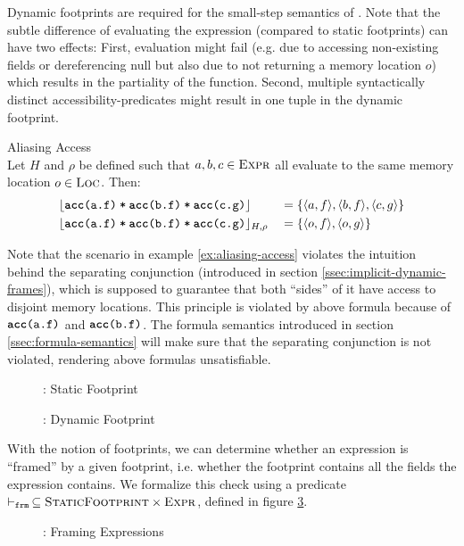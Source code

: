 \begin{description}
    Dynamic footprints are required for the small-step semantics of \svlidf.
    Note that the subtle difference of evaluating the expression (compared to static footprints) can have two effects:
    First, evaluation might fail (e.g. due to accessing non-existing fields or dereferencing null but also due to not returning a memory location $o$) which results in the partiality of the function.
    Second, multiple syntactically distinct accessibility-predicates might result in one tuple in the dynamic footprint.
    \begin{example}{Aliasing Access}\\
        \label{ex:aliasing-access}
        Let $H$ and $\rho$ be defined such that $a, b, c \in \setExpr$ all evaluate to the same memory location $o \in \setLoc$.
        Then:
        \begin{alignat*}{2}
        & \staticFP{\phiCons{\phiAcc{a}{f}}{\phiCons{\phiAcc{b}{f}}{\phiAcc{c}{g}}}} &&= \{ \langle a, f \rangle, \langle b, f \rangle, \langle c, g \rangle \}\\
        & \dynamicFP{H}{\rho}{\phiCons{\phiAcc{a}{f}}{\phiCons{\phiAcc{b}{f}}{\phiAcc{c}{g}}}} &&= \{ \langle o, f \rangle, \langle o, g \rangle \}
        \end{alignat*}
    \end{example}
    
    Note that the scenario in example \ref{ex:aliasing-access} violates the intuition behind the separating conjunction (introduced in section \ref{ssec:implicit-dynamic-frames}), which is supposed to guarantee that both “sides” of it have access to disjoint memory locations.
    This principle is violated by above formula because of $\phiAcc{a}{f}$ and $\phiAcc{b}{f}$.
    The formula semantics introduced in section \ref{ssec:formula-semantics} will make sure that the separating conjunction is not violated, rendering above formulas unsatisfiable.
\end{description}
\begin{figure}[h]
    
    \caption{\svlidf: Static Footprint}
    \label{fig:sfp}
\end{figure}
\begin{figure}[h]
    
    \caption{\svlidf: Dynamic Footprint}
    \label{fig:dfp}
\end{figure}

With the notion of footprints, we can determine whether an expression is “framed” by a given footprint, i.e. whether the footprint contains all the fields the expression contains.
We formalize this check using a predicate $\sfrme \subseteq \setSFootprint \times \setExpr$, defined in figure \ref{fig:svl-frme}.
\begin{figure}
    
    \caption{\svlidf: Framing Expressions}
    \label{fig:svl-frme}
\end{figure}

